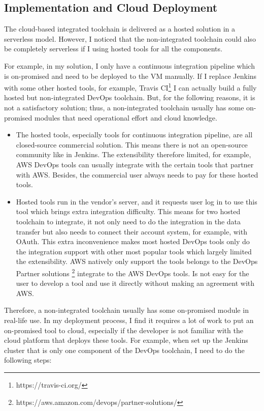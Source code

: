 \subsection{Implementation and Cloud Deployment}
The cloud-based integrated toolchain is delivered as a hosted solution in a serverless model. However, I noticed that the non-integrated toolchain could also be completely serverless if I using hosted tools for all the components. 
\par
For example, in my solution, I only have a continuous integration pipeline which is on-promised and need to be deployed to the VM manually. If I replace Jenkins with some other hosted tools, for example, Travis CI\footnote{https://travis-ci.org/} I can actually build a fully hosted but non-integrated DevOps toolchain. But, for the following reasons, it is not a satisfactory solution; thus, a non-integrated toolchain usually has some on-promised modules that need operational effort and cloud knowledge.
\begin{itemize}
 \item The hosted tools, especially tools for continuous integration pipeline, are all closed-source commercial solution. This means there is not an open-source community like in Jenkins. The extensibility therefore limited, for example, AWS DevOps tools can usually integrate with the certain tools that partner with AWS. Besides, the commercial user always needs to pay for these hosted tools.
 \item Hosted tools run in the vendor's server, and it requests user log in to use this tool which brings extra integration difficulty. This means for two hosted toolchain to integrate, it not only need to do the integration in the data transfer but also needs to connect their account system, for example, with OAuth. This extra inconvenience makes most hosted DevOps tools only do the integration support with other most popular tools which largely limited the extensibility. AWS natively only support the tools belongs to the DevOps Partner solutions \footnote{https://aws.amazon.com/devops/partner-solutions/} integrate to the AWS DevOps tools. Is not easy for the user to develop a tool and use it directly without making an agreement with AWS.
\end{itemize}
Therefore, a non-integrated toolchain usually has some on-promised module in real-life use. In my deployment process, I find it requires a lot of work to put an on-promised tool to cloud, especially if the developer is not familiar with the cloud platform that deploys these tools. For example, when set up the Jenkins cluster that is only one component of the DevOps toolchain, I need to do the following steps:
